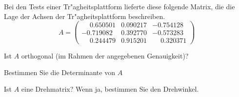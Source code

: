 Bei den Tests einer Tr"agheitsplattform lieferte diese folgende Matrix,
die die Lage der Achsen der Tr"agheitsplattform beschreiben.
\[
A=\begin{pmatrix}
\phantom{-}0.650501&0.090217&          -0.754128\\
  -0.719082&0.392770&          -0.573283\\
\phantom{-}0.244479&0.915201&\phantom{-}0.320371
\end{pmatrix}
\]
\begin{teilaufgaben}
\item Ist $A$ orthogonal (im Rahmen der angegebenen Genauigkeit)?
\item Bestimmen Sie die Determinante von $A$
\item Ist $A$ eine Drehmatrix? Wenn ja, bestimmen Sie den Drehwinkel.
\end{teilaufgaben}

